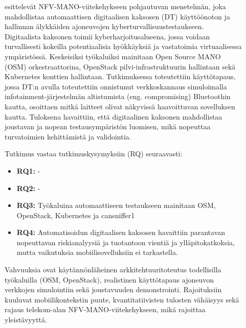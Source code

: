 \documentclass[bscthesis,finnish,oneside,biblatex]{uefcsthesis}
\begin{document}
\begin{description}
    \item[\cite{grasselli2023_digitaltwin}] esittelevät NFV-MANO-viitekehykseen pohjautuvan menetelmän, joka mahdollistaa automaattisen digitaalisen kaksosen (DT) käyttöönoton ja hallinnan älykkäiden ajoneuvojen kyberturvallisuustestaukseen. Digitaalista kaksonen toimii kyberharjoitusalueena, jossa voidaan turvallisesti kokeilla potentiaalisia hyökkäyksiä ja vastatoimia virtuaalisessa ympäristössä. Keskeisiksi työkaluiksi mainitaan Open Source MANO (OSM) orkestraattorina, OpenStack pilvi-infrastruktuurin hallintaan sekä Kubernetes konttien hallintaan. Tutkimuksessa toteutettiin käyttötapaus, jossa DT:n avulla toteutettiin onnistunut verkkoskannaus simuloimalla infotainment-järjestelmän altistumista (eng. compromising) Bluetoothin kautta, osoittaen mitkä laitteet olivat näkyvissä haavoittuvan sovelluksen kautta. Tuloksena havaittiin, että digitaalinen kaksonen mahdollistaa joustavan ja nopean testausympäristön luomisen, mikä nopeuttaa turvatoimien kehittämistä ja validointia.

    Tutkimus vastaa tutkimuskysymyksiin (RQ) seuraavasti:
    \begin{itemize}
        \item \textbf{RQ1:} -
        \item \textbf{RQ2:} -
        \item \textbf{RQ3:} Työkaluina automaattiseen testaukseen mainitaan OSM, OpenStack, Kubernetes ja cansniffer1
        \item \textbf{RQ4:} Automatisoidun digitaalisen kaksosen havaittiin parantavan nopeuttavan riskianalyysiä ja tuotantoon vientiä ja ylläpitokatkoksia, mutta vaikutuksia mobiilisovelluksiin ei tarkastella.
    \end{itemize}

    Vahvuuksia ovat käytännönläheinen arkkitehtuuritoteutus todellisilla työkaluilla (OSM, OpenStack), realistinen käyttötapaus ajoneuvon verkkojen simulointiin sekä joustavuuden demonstrointi. Rajoituksiin kuuluvat mobiilikontekstin puute, kvantitatiivisten tulosten vähäisyys sekä rajaus telekom-alan NFV-MANO-viitekehykseen, mikä rajoittaa yleistävyyttä.
\end{description}
\end{document}
